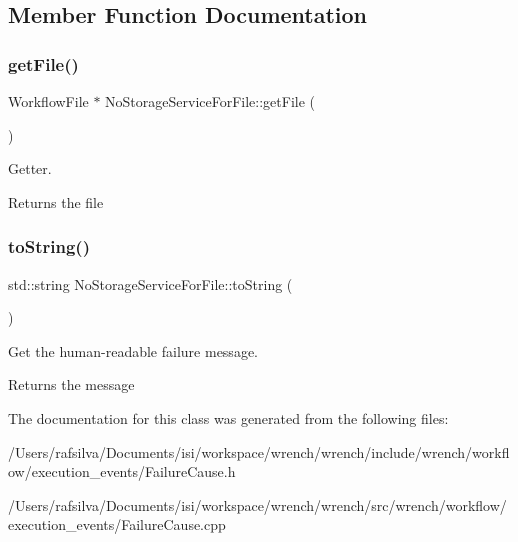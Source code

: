 \subsection{Member Function Documentation}
\mbox{\label{class_no_storage_service_for_file_ac54e15f8b994dfe9f3c48a6a180d3994}} 
\subsubsection{\texorpdfstring{get\+File()}{getFile()}}
{\footnotesize\ttfamily Workflow\+File $\ast$ No\+Storage\+Service\+For\+File\+::get\+File (\begin{DoxyParamCaption}{ }\end{DoxyParamCaption})}



Getter. 

\begin{DoxyReturn}{Returns}
the file 
\end{DoxyReturn}
\mbox{\label{class_no_storage_service_for_file_a77df40bdde415fc7b0db40ae923cdcf9}} 
\subsubsection{\texorpdfstring{to\+String()}{toString()}}
{\footnotesize\ttfamily std\+::string No\+Storage\+Service\+For\+File\+::to\+String (\begin{DoxyParamCaption}{ }\end{DoxyParamCaption})}



Get the human-\/readable failure message. 

\begin{DoxyReturn}{Returns}
the message 
\end{DoxyReturn}


The documentation for this class was generated from the following files\+:\begin{DoxyCompactItemize}
\item 
/\+Users/rafsilva/\+Documents/isi/workspace/wrench/wrench/include/wrench/workflow/execution\+\_\+events/Failure\+Cause.\+h\item 
/\+Users/rafsilva/\+Documents/isi/workspace/wrench/wrench/src/wrench/workflow/execution\+\_\+events/Failure\+Cause.\+cpp\end{DoxyCompactItemize}
